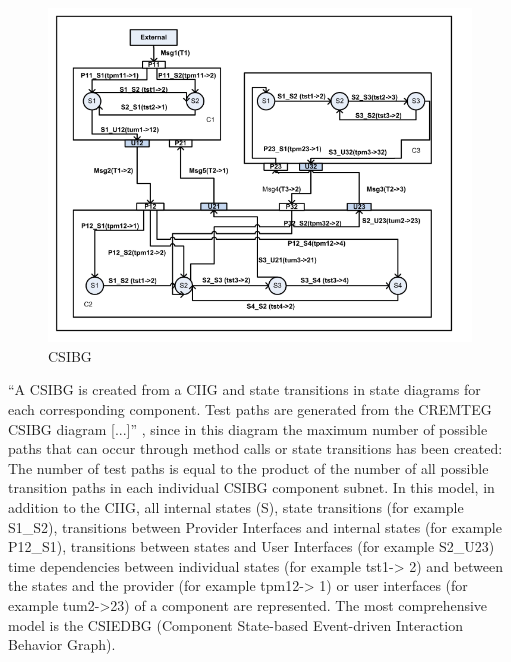 \begin{figure}[H]
	\centering
	\includegraphics{../images/CSIBG} 
	\caption{CSIBG \cite{Guan2015}}
\end{figure}
\enquote{A CSIBG is created from a CIIG and state transitions
in state diagrams for each corresponding component. Test paths are
generated from the CREMTEG CSIBG diagram {[}...{]}} \cite{Guan2015},
since in this diagram the maximum number of possible paths that can
occur through method calls or state transitions has been created:
The number of test paths is equal to the product of the number of
all possible transition paths in each individual CSIBG component subnet.
In this model, in addition to the CIIG, all internal states (S),
state transitions (for example S1\_S2), transitions between Provider
Interfaces and internal states (for example P12\_S1), transitions
between states and User Interfaces (for example S2\_U23) time
dependencies between individual states (for example tst1-\textgreater
2) and between the states and the provider (for example tpm12-\textgreater
1) or user interfaces (for example tum2-\textgreater 23) of a component
are represented. The most comprehensive model is the CSIEDBG (Component
State-based Event-driven Interaction Behavior Graph).

